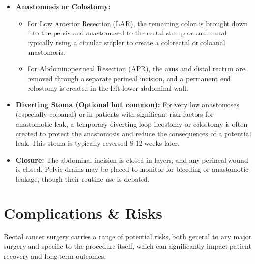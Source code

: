 \begin{itemize}
  \item \textbf{Anastomosis or Colostomy:}
    \begin{itemize}
      \item For Low Anterior Resection (LAR), the remaining colon is brought down into the pelvis and anastomosed to the rectal stump or anal canal, typically using a circular stapler to create a colorectal or coloanal anastomosis.
      \item For Abdominoperineal Resection (APR), the anus and distal rectum are removed through a separate perineal incision, and a permanent end colostomy is created in the left lower abdominal wall.
    \end{itemize}
  
  \item \textbf{Diverting Stoma (Optional but common):} For very low anastomoses (especially coloanal) or in patients with significant risk factors for anastomotic leak, a temporary diverting loop ileostomy or colostomy is often created to protect the anastomosis and reduce the consequences of a potential leak. This stoma is typically reversed 8-12 weeks later.
  
  \item \textbf{Closure:} The abdominal incision is closed in layers, and any perineal wound is closed. Pelvic drains may be placed to monitor for bleeding or anastomotic leakage, though their routine use is debated.
\end{itemize}

\section*{Complications \& Risks}
Rectal cancer surgery carries a range of potential risks, both general to any major surgery and specific to the procedure itself, which can significantly impact patient recovery and long-term outcomes.


